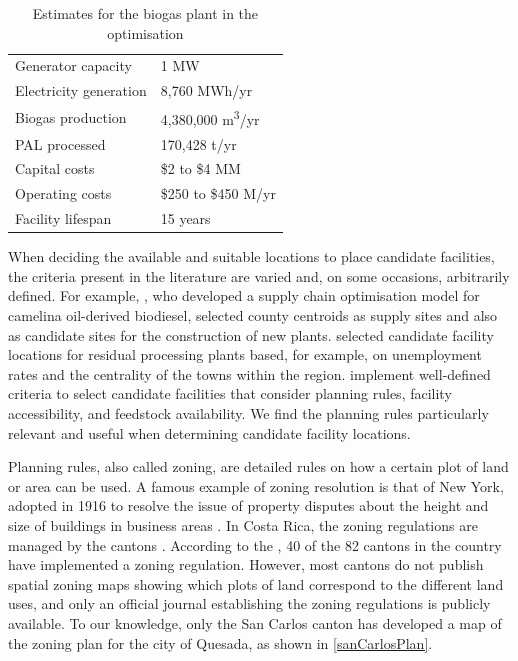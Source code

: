 \begin{table}[H]
\centering
\begin{threeparttable}
\caption{Estimates for the biogas plant in the optimisation}
\label{biogasEstimates}
\begin{tabular}{ll} 
\hline \hline  
Generator capacity          & 1 MW                      \\
Electricity generation      & 8,760 MWh/yr            \\
Biogas production           & 4,380,000 \si{\meter\cubed}/yr           \\
PAL processed               & 170,428 t/yr           \\
Capital costs               & \$2 to \$4 MM          \\
Operating costs             & \$250 to \$450 M/yr  \\
Facility lifespan           & 15 years                 \\ 
\hline   \hline     
\end{tabular}
\end{threeparttable}%
\end{table}


When deciding the available and suitable locations to place candidate facilities, the criteria present in the literature are varied and, on some occasions, arbitrarily defined. For example, \cite{jeong2019biodiesel}, who developed a supply chain optimisation model for camelina oil-derived biodiesel, selected county centroids as supply sites and also as candidate sites for the construction of new plants. \cite{caballero2007solving} selected candidate facility locations for residual processing plants based, for example, on unemployment rates and the centrality of the towns within the region. \cite{delivand2015optimal} implement well-defined criteria to select candidate facilities that consider planning rules, facility accessibility, and feedstock availability. We find the planning rules particularly relevant and useful when determining candidate facility locations.

Planning rules, also called zoning, are detailed rules on how a certain plot of land or area can be used. A famous example of zoning resolution is that of New York, adopted in 1916 to resolve the issue of property disputes about the height and size of buildings in business areas \citep{weiss1992skyscraper}. In Costa Rica, the zoning regulations are managed by the cantons \citep{planesRegCR}. According to the \citeauthor{PlanesReguladoresPortal}, 40 of the 82 cantons in the country have implemented a zoning regulation. However, most cantons do not publish spatial zoning maps showing which plots of land correspond to the different land uses, and only an official journal establishing the zoning regulations is publicly available. To our knowledge, only the San Carlos canton has developed a map of the zoning plan for the city of Quesada, as shown in \cref{sanCarlosPlan}.

